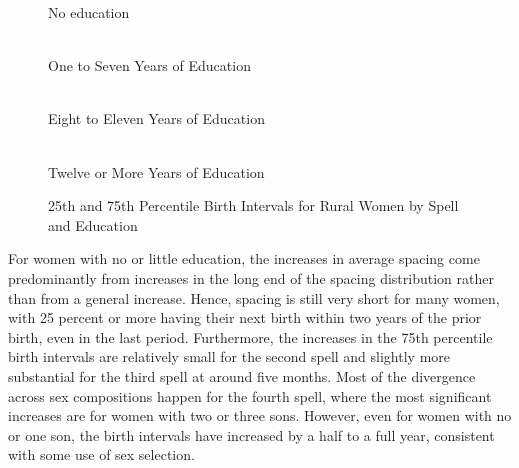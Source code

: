 \documentclass[12pt,letterpaper]{article}
\begin{document}
\begin{figure}[htpb]
\captionsetup[subfigure]{position=top}
\captionsetup{font=footnotesize,skip=2pt}
\centering
\caption*{No education}
\\
\caption*{One to Seven Years of Education}
\\
\caption*{Eight to Eleven Years of Education}
\\
\caption*{Twelve or More Years of Education}
\begin{minipage}{0.32\textwidth}\hspace{1cm}\end{minipage}
\captionsetup{font=normalsize}
\caption{
25th and 75th Percentile Birth Intervals for Rural Women by Spell and Education
}
\label{fig:combined_p25_p75_rural}
\end{figure}


For women with no or little education, the increases in average spacing
come predominantly from increases in the long end of the spacing
distribution rather than from a general increase.
Hence, spacing is still very short for many women, with 25 percent or more having
their next birth within two years of the prior birth, even in the last period.
Furthermore, the increases in the 75th percentile birth intervals are relatively small
for the second spell and slightly more substantial for the third spell at around five months.
Most of the divergence across sex compositions happen for the fourth spell, where 
the most significant increases are for women with two or three sons.
However, even for women with no or one son, the birth intervals have
increased by a half to a full year, consistent with some use of sex
selection.
\end{document}
